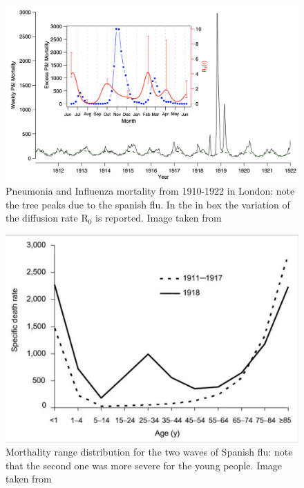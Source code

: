 \documentclass[
12pt, %
a4paper, %
oneside, %
headinclude,footinclude, %
BCOR5mm, %
]{scrartcl}
\begin{document}
\begin{figure}[h]
 \centering
 \includegraphics[width=1\linewidth]{Figures/SpanishFLU.png} 
 \caption{Pneumonia and Influenza mortality from 1910-1922 in London: note the tree peaks due to the spanish flu. In the in box the variation of the diffusion rate R$_{0}$ is reported. Image taken from \cite{he2011mechanistic} }
 \label{SpanishFLU}
\end{figure}

\begin{figure}[h]
 \centering
 \includegraphics[width=0.6\linewidth]{Figures/Mortality_spanish_flu.png} 
 \caption{Morthality range distribution for the two waves of Spanish flu: note that the second one was more severe for the young people. Image taken from \cite{taubenberger20061918}}
 \label{Mortality_spanish_flu}
\end{figure}
\end{document}
